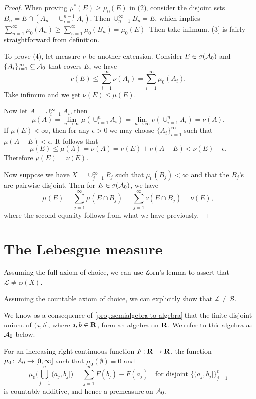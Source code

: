 \begin{proof}
When proving $\mu^{*}(E)\geq\mu_{0}(E)$ in (2), consider the disjoint
sets $B_{n}=E\cap(A_{n}-\cup_{i=1}^{n-1}A_{i})$. Then $\cup_{n=1}^{\infty}B_{n}=E$,
which implies $\sum_{n=1}^{\infty}\mu_{0}(A_{n})\geq\sum_{n=1}^{\infty}\mu_{0}(B_{n})=\mu_{0}(E)$.
Then take infimum. (3) is fairly straightforward from definition.

To prove (4), let measure $\nu$ be another extension. Consider $E\in\sigma(\mathcal{A}_{0})$
and $\{A_{i}\}_{i=1}^{\infty}\subseteq\mathcal{A}_{0}$ that covers $E$, we
have 
\[
\nu(E)\leq\sum_{i=1}^{\infty}\nu(A_{i})=\sum_{i=1}^{\infty}\mu_{0}(A_{i}).
\]
Take infimum and we get $\nu(E)\leq\mu(E)$.

Now let $A=\cup_{i=1}^{\infty}A_{i}$, then 
\[
\mu(A)=\lim_{n\to\infty}\mu(\cup_{i=1}^{n}A_{i})=\lim_{n\to\infty}\nu(\cup_{i=1}^{n}A_{i})=\nu(A).
\]
If $\mu(E)<\infty$, then for any $\epsilon>0$ we may choose $\{A_{i}\}_{i=1}^{\infty}$
such that $\mu(A-E)<\epsilon$. It follows that 
\[
\mu(E)\leq\mu(A)=\nu(A)=\nu(E)+\nu(A-E)<\nu(E)+\epsilon.
\]
 Therefore $\mu(E)=\nu(E)$.

Now suppose we have $X=\cup_{j=1}^{\infty}B_{j}$ such that $\mu_{0}(B_{j})<\infty$
and that the $B_{j}$'s are pairwise disjoint. Then for $E\in\sigma(\mathcal{A}_{0})$,
we have 
\[
\mu(E)=\sum_{j=1}^{\infty}\mu(E\cap B_{j})=\sum_{j=1}^{\infty}\nu(E\cap B_{j})=\nu(E),
\]
where the second equality follows from what we have previously.
\end{proof}

\section{The Lebesgue measure}
\begin{fact}
    Assuming the full axiom of choice, we can use Zorn's lemma to assert that $\mathcal{L} \neq \wp(X)$.
\end{fact}

\begin{fact}
    Assuming the countable axiom of choice, we can explicitly show that $\mathcal L \neq \mathcal B$.
\end{fact}

We know as a consequence of \cref{prop:semialgebra-to-algebra} that the finite disjoint unions of $(a,b]$, where $a,b\in \mathbf{R}$, form an algebra on $\mathbf{R}$. We refer to this algebra as $\mathcal{A}_0$ below.

\begin{thm} \label{thm:premeasure-h-intervals}
    For an increasing right-continuous function $F\colon \mathbf{R} \to \mathbf{R}$, the function $\mu_0\colon \mathcal{A}_0 \to [0,\infty]$ such that $\mu_0(\emptyset) = 0$ and \[
        \mu_0\biggl(\bigcup_{j=1}^n (a_j,b_j]\biggr) = \sum_{j=1}^n F(b_j) - F(a_j)\quad \text{for disjoint }\{(a_j,b_j]\}_{j=1}^n
    \] is countably additive, and hence a premeasure on $\mathcal{A}_0$.
\end{thm}

